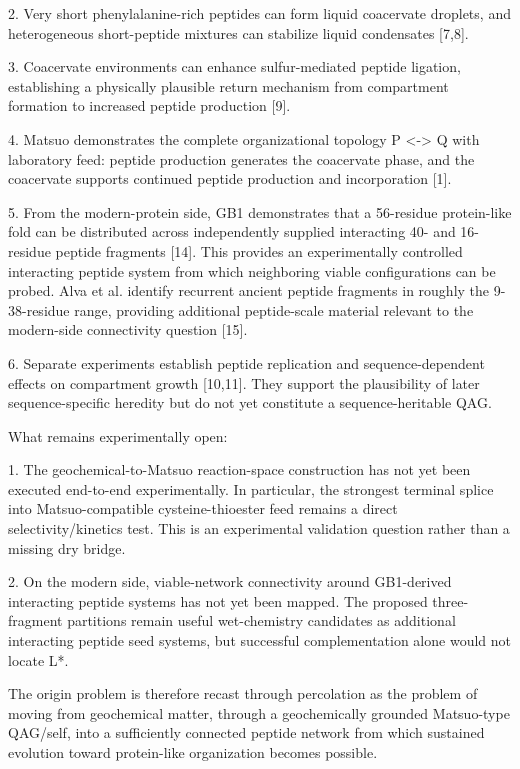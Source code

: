 \documentclass[11pt]{article}
\begin{document}
2. Very short phenylalanine-rich peptides can form liquid coacervate droplets, and heterogeneous short-peptide mixtures can stabilize liquid condensates {[}7,8{]}.

3. Coacervate environments can enhance sulfur-mediated peptide ligation, establishing a physically plausible return mechanism from compartment formation to increased peptide production {[}9{]}.

4. Matsuo demonstrates the complete organizational topology P \textless-\textgreater{} Q with laboratory feed: peptide production generates the coacervate phase, and the coacervate supports continued peptide production and incorporation {[}1{]}.

5. From the modern-protein side, GB1 demonstrates that a 56-residue protein-like fold can be distributed across independently supplied interacting 40- and 16-residue peptide fragments {[}14{]}. This provides an experimentally controlled interacting peptide system from which neighboring viable configurations can be probed. Alva et al. identify recurrent ancient peptide fragments in roughly the 9-38-residue range, providing additional peptide-scale material relevant to the modern-side connectivity question {[}15{]}.

6. Separate experiments establish peptide replication and sequence-dependent effects on compartment growth {[}10,11{]}. They support the plausibility of later sequence-specific heredity but do not yet constitute a sequence-heritable QAG.

What remains experimentally open:

1. The geochemical-to-Matsuo reaction-space construction has not yet been executed end-to-end experimentally. In particular, the strongest terminal splice into Matsuo-compatible cysteine-thioester feed remains a direct selectivity/kinetics test. This is an experimental validation question rather than a missing dry bridge.

2. On the modern side, viable-network connectivity around GB1-derived interacting peptide systems has not yet been mapped. The proposed three-fragment partitions remain useful wet-chemistry candidates as additional interacting peptide seed systems, but successful complementation alone would not locate L*.

The origin problem is therefore recast through percolation as the problem of moving from geochemical matter, through a geochemically grounded Matsuo-type QAG/self, into a sufficiently connected peptide network from which sustained evolution toward protein-like organization becomes possible.
\end{document}
